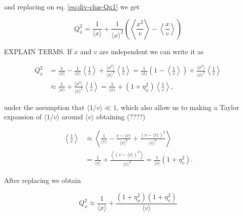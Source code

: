 and replacing on eq. \eqref{eq:div-clus-Qx1} we get

\begin{equation}
  \label{eq:div-clus-Qx2}
  \boxed{Q_x^2 = \frac{1}{\langle x\rangle} + \frac{1}{\langle x\rangle^2}\left(\left\langle \frac{x^2}{v}\right\rangle-\left\langle \frac{x}{v}\right\rangle \right)}
\end{equation}

EXPLAIN TERMS. If $x$ and $v$ are independent we can write it as

\begin{equation}
  \begin{split}
    Q_x^2 &= \frac{1}{\langle x\rangle} - \frac{1}{\langle x\rangle}\left\langle\frac{1}{v}\right\rangle + \frac{\langle x^2\rangle}{\langle x\rangle^2}\left\langle\frac{1}{v}\right\rangle = \frac{1}{\langle x\rangle}\left(1-\left\langle\frac{1}{v}\right\rangle\right)+\frac{\langle x^2\rangle}{\langle x\rangle^2}\left\langle\frac{1}{v}\right\rangle\\
  &\approx \frac{1}{\langle x\rangle} + \frac{\langle x^2\rangle}{\langle x\rangle^2}\left\langle\frac{1}{v}\right\rangle = \frac{1}{\langle x\rangle} + \left(1+\eta_x^2\right)\left\langle\frac{1}{v}\right\rangle,
  \end{split}
\end{equation}

under the assumption that $\langle 1/v\rangle \ll 1$, which also allow us to making a Taylor expansion of $\langle 1/v\rangle$ around $\langle v\rangle$ obtaining (????)

\begin{equation}
  \begin{split}
    \left\langle\frac{1}{v}\right\rangle &\approx \left\langle \frac{1}{\langle v\rangle} - \frac{v-\langle v\rangle}{\langle v\rangle^2} + \frac{(v-\langle v\rangle)^2}{\langle v\rangle^3}\right\rangle\\
    &=\frac{1}{\langle v\rangle} + \frac{\left\langle(v-\langle v\rangle)^2\right\rangle}{\langle v\rangle^3} = \frac{1}{\langle v\rangle}\left(1+\eta_v^2\right).
  \end{split}
\end{equation}

After replacing we obtain

\begin{equation}
  \boxed{Q_x^2 \approx \frac{1}{\langle x\rangle} + \frac{(1+\eta_x^2)(1+\eta_v^2)}{\langle v\rangle}}
\end{equation}

